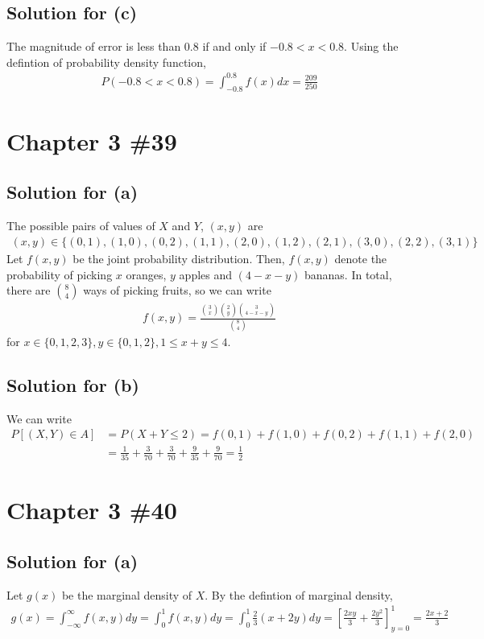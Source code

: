 \documentclass{scrartcl}
\begin{document}
\subsection{Solution for (c)}
The magnitude of error is less than 0.8 if and only if \(-0.8 < x < 0.8\). Using
the defintion of probability density function,
\begin{align*}
  P(-0.8 < x < 0.8) = \int^{0.8}_{-0.8} f(x) dx = \frac{209}{250}
\end{align*}

\section{Chapter 3 \#39}
\subsection{Solution for (a)}
The possible pairs of values of \(X\) and \(Y\), \((x, y)\) are
\begin{align*}
  (x, y) \in \{(0, 1), (1, 0), (0, 2), (1, 1), (2, 0), (1, 2), (2, 1), (3, 0),
  (2, 2), (3, 1)\}
\end{align*}
Let \(f(x, y)\) be the joint probability distribution. Then, \(f(x, y)\) denote
the probability of picking \(x\) oranges, \(y\) apples and \((4 - x - y)\)
bananas. In total, there are \(8 \choose 4\) ways of picking fruits, so we can
write
\begin{align*}
  f(x, y)
  = \frac{{3 \choose x} {2 \choose y} {3 \choose {4 - x - y}}}{{8 \choose 4}}
\end{align*}
for \(x \in \{0, 1, 2, 3\}, y \in \{0, 1, 2\}, 1 \leq x + y \leq 4\).

\subsection{Solution for (b)}
We can write
\begin{align*}
  P[(X, Y) \in A]
  &= P(X + Y \leq 2)
  = f(0, 1) + f(1, 0) + f(0, 2) + f(1, 1) + f(2, 0) \\
  &= \frac{1}{35} + \frac{3}{70} + \frac{3}{70} + \frac{9}{35} + \frac{9}{70}
  = \frac{1}{2}
\end{align*}

\section{Chapter 3 \#40}
\subsection{Solution for (a)}
Let \(g(x)\) be the marginal density of \(X\). By the defintion of marginal
density,
\begin{align*}
  g(x)
  = \int^\infty_{-\infty} f(x, y) dy
  = \int^1_0 f(x, y) dy
  = \int^1_0 \frac{2}{3} (x + 2y) dy
  = \left[ \frac{2xy}{3} + \frac{2y^2}{3} \right]^1_{y = 0}
  = \frac{2x + 2}{3}
\end{align*}
\end{document}
